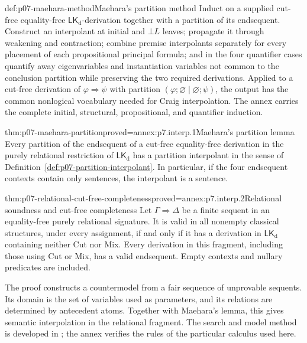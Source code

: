 \begin{hbmethod}{def:p07-maehara-method}{Maehara's partition method}
Induct on a supplied cut-free equality-free
\(\mathsf{LK}_{\mathrm d}\)-derivation together with a partition of its
endsequent.  Construct an interpolant at initial and \(\bot L\) leaves;
propagate it through weakening and contraction; combine premise interpolants
separately for every placement of each propositional principal formula; and
  in the four quantifier cases quantify away eigenvariables and instantiation
  variables not common to the conclusion partition while preserving the two
  required derivations.  Applied to a
cut-free derivation of \(\varphi\Rightarrow\psi\) with partition
\((\varphi;\varnothing\mid\varnothing;\psi)\), the output has the common
nonlogical vocabulary needed for Craig interpolation.  The annex carries the
complete initial, structural, propositional, and quantifier induction.
\end{hbmethod}

\begin{hblemma}{thm:p07-maehara-partition}{proved=annex:p7.interp.1}{Maehara's partition lemma}
Every partition of the endsequent of a cut-free equality-free derivation in
the purely relational restriction of \(\mathsf{LK}_{\mathrm d}\) has a partition interpolant in the
sense of Definition~\ref{def:p07-partition-interpolant}.  In particular, if
the four endsequent contexts contain only sentences, the interpolant is a
sentence.
\end{hblemma}

\begin{hbtheorem}{thm:p07-relational-cut-free-completeness}{proved=annex:p7.interp.2}{Relational soundness and cut-free completeness}
Let \(\Gamma\Rightarrow\Delta\) be a finite sequent in an equality-free
purely relational signature.  It is valid in all nonempty classical
structures, under every assignment, if and only if it has a derivation
in \(\mathsf{LK}_{\mathrm d}\) containing neither Cut nor Mix.
Every derivation in this fragment, including those using Cut or Mix,
has a valid endsequent.  Empty contexts and nullary predicates are included.
\end{hbtheorem}

The proof constructs a countermodel from a fair sequence of unprovable
sequents.  Its domain is the set of variables used as parameters, and its
relations are determined by antecedent atoms.  Together with Maehara's
lemma, this gives semantic interpolation in the relational fragment.
The search and model method is developed in
\cite[\S5.4]{Gallier2015}; the annex verifies the rules of the
particular calculus used here.

